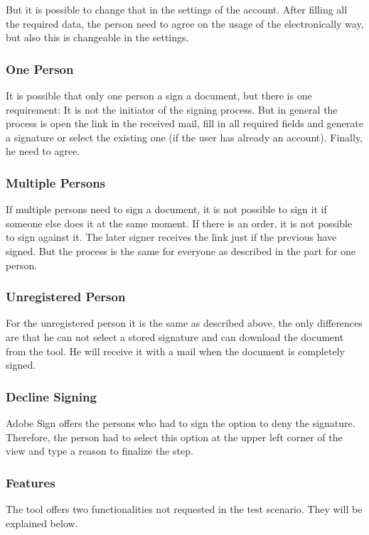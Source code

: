But it is possible to change that in the settings of the account. After filling all the required data, the person need to agree on the usage of the electronically way, but also this is changeable in the settings. 

\subsubsection{One Person}
It is possible that only one person a sign a document, but there is one requirement: It is not the initiator of the signing process. But in general the process is open the link in the received mail, fill in all required fields and generate a signature or select the existing one (if the user has already an account). Finally, he need to agree.

\subsubsection{Multiple Persons}
If multiple persons need to sign a document, it is not possible to sign it if someone else does it at the same moment. If there is an order, it is not possible to sign against it. The later signer receives the link just if the previous have signed. But the process is the same for everyone as described in the part for one person.

\subsubsection{Unregistered Person}
For the unregistered person it is the same as described above, the only differences are that he can not select a stored signature and can download the document from the tool. He will receive it with a mail when the document is completely signed.

\subsubsection{Decline Signing}
Adobe Sign offers the persons who had to sign the option to deny the signature. Therefore, the person had to select this option at the upper left corner of the view and type a reason to finalize the step. 

\subsubsection{Features}
The tool offers two functionalities not requested in the test scenario. They will be explained below.


